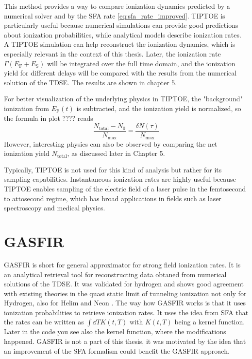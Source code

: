 \bigskip
This method provides a way to compare ionization dynamics predicted by a numerical solver and by the SFA rate \eqref{eq:sfa_rate_improved}.
TIPTOE is particularly useful because numerical simulations can provide good predictions about ionization probabilities, while analytical models describe ionization rates.
A TIPTOE simulation can help reconstruct the ionization dynamics, which is especially relevant in the context of this thesis.
Later, the ionization rate $\Gamma(E_{\mathrm{F}}+E_{\mathrm{S}})$ will be integrated over the full time domain, and the ionization yield for different delays will be compared with the results from the numerical solution of the TDSE.
The results are shown in chapter 5.

For better visualization of the underlying physics in TIPTOE, the "background" ionization from $E_\mathrm{F}(t)$ is subtracted, and the ionization yield is normalized, so the formula in plot ???? reads
\begin{equation*}
\frac{N_{\mathrm{total}}-N_0}{N_{\mathrm{max}}}=\frac{\delta N(\tau)}{N_{\mathrm{max}}}
\end{equation*}
However, interesting physics can also be observed by comparing the net ionization yield $N_{\mathrm{total}}$, as discussed later in Chapter 5.

Typically, TIPTOE is not used for this kind of analysis but rather for its sampling capabilities.
Instantaneous ionization rates are highly useful because TIPTOE enables sampling of the electric field of a laser pulse in the femtosecond to attosecond regime, which has broad applications in fields such as laser spectroscopy and medical physics.






\section{GASFIR}
GASFIR is short for general approximator for strong field ionization rates.
It is an analytical retrieval tool for reconstructing data obtaned from numerical solutions of the TDSE. 
It was validated for hydrogen and shows good agreement with existing theories in the quasi static limit of tunneling ionization not only for Hydrogen, also for Helim and Neon \cite{agarwal2025generalapproximatorstrongfieldionization}.
The way how GASFIR works is that it uses ionization probabilities to retrieve ionization rates. 
It uses the idea from SFA that the rates can be written as $\int \dd T K(t,T)$ with $K(t,T)$ being a kernel function.
Later in the code you see also the kernel function, where the modifications happened. 
GASFIR is not a part of this thesis, it was motivated by the idea that an improvement of the SFA formalism could benefit the GASFIR approach.






